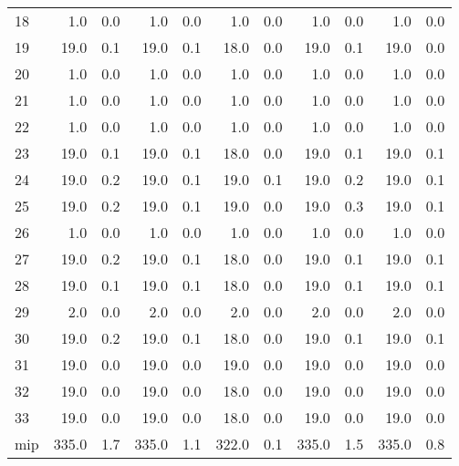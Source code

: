 \begin{tabular}{lrrrrrrrrrr}
     18 &   1.0 &   0.0 &   1.0 &     0.0 &   1.0 &     0.0 &   1.0 &     0.0 &   1.0 &     0.0 \\
     19 &  19.0 &   0.1 &  19.0 &     0.1 &  18.0 &     0.0 &  19.0 &     0.1 &  19.0 &     0.0 \\
     20 &   1.0 &   0.0 &   1.0 &     0.0 &   1.0 &     0.0 &   1.0 &     0.0 &   1.0 &     0.0 \\
     21 &   1.0 &   0.0 &   1.0 &     0.0 &   1.0 &     0.0 &   1.0 &     0.0 &   1.0 &     0.0 \\
     22 &   1.0 &   0.0 &   1.0 &     0.0 &   1.0 &     0.0 &   1.0 &     0.0 &   1.0 &     0.0 \\
     23 &  19.0 &   0.1 &  19.0 &     0.1 &  18.0 &     0.0 &  19.0 &     0.1 &  19.0 &     0.1 \\
     24 &  19.0 &   0.2 &  19.0 &     0.1 &  19.0 &     0.1 &  19.0 &     0.2 &  19.0 &     0.1 \\
     25 &  19.0 &   0.2 &  19.0 &     0.1 &  19.0 &     0.0 &  19.0 &     0.3 &  19.0 &     0.1 \\
     26 &   1.0 &   0.0 &   1.0 &     0.0 &   1.0 &     0.0 &   1.0 &     0.0 &   1.0 &     0.0 \\
     27 &  19.0 &   0.2 &  19.0 &     0.1 &  18.0 &     0.0 &  19.0 &     0.1 &  19.0 &     0.1 \\
     28 &  19.0 &   0.1 &  19.0 &     0.1 &  18.0 &     0.0 &  19.0 &     0.1 &  19.0 &     0.1 \\
     29 &   2.0 &   0.0 &   2.0 &     0.0 &   2.0 &     0.0 &   2.0 &     0.0 &   2.0 &     0.0 \\
     30 &  19.0 &   0.2 &  19.0 &     0.1 &  18.0 &     0.0 &  19.0 &     0.1 &  19.0 &     0.1 \\
     31 &  19.0 &   0.0 &  19.0 &     0.0 &  19.0 &     0.0 &  19.0 &     0.0 &  19.0 &     0.0 \\
     32 &  19.0 &   0.0 &  19.0 &     0.0 &  18.0 &     0.0 &  19.0 &     0.0 &  19.0 &     0.0 \\
     33 &  19.0 &   0.0 &  19.0 &     0.0 &  18.0 &     0.0 &  19.0 &     0.0 &  19.0 &     0.0 \\
    mip & 335.0 &   1.7 & 335.0 &     1.1 & 322.0 &     0.1 & 335.0 &     1.5 & 335.0 &     0.8 \\
\bottomrule
\end{tabular}
